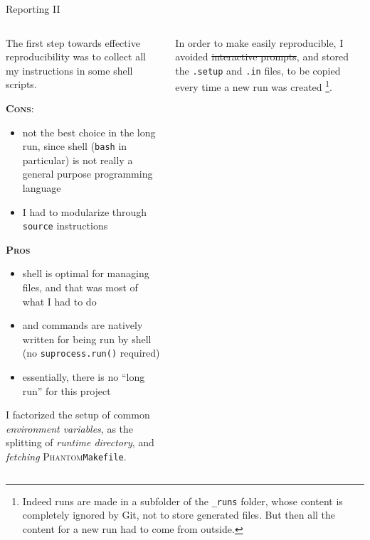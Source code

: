 \documentclass[9pt]{beamer}
\renewcommand{\phantom}{\textsc{Phantom}\xspace}
\begin{document}
\begin{frame}{Reporting II}
    \begin{columns}
        \begin{column}{0.5\textwidth}
            \vspace*{10pt}

            The first step towards effective reproducibility was to collect all
            my instructions in some shell scripts.
            \vspace*{10pt}

            \textsc{\color{BrickRed} \textbf{Cons}}:
            \begin{itemize}
                \item not the best choice in the long run, since shell
                    (\texttt{bash} in particular) is not really a general
                    purpose programming language
                \item I had to modularize through \texttt{source} instructions
            \end{itemize}
            
            \textsc{\color{mLightGreen} \textbf{Pros}}
            \begin{itemize}
                \item shell is optimal for managing files, and that was most of
                    what I had to do
                \item and commands are natively written for being run by shell
                    (no \texttt{suprocess.run()} required)
                \item essentially, there is no \enquote{long run} for this
                    project
            \end{itemize}
            \vspace*{10pt}
            
            I factorized the setup of common \textit{environment variables}, as
            the splitting of \textit{runtime directory}, and \textit{fetching}
            \phantom \texttt{Makefile}.
        \end{column}
        \begin{column}{0.5\textwidth}
            \vspace*{10pt}

            In order to make easily reproducible, I avoided \sout{interactive
            prompts}, and stored the \texttt{.setup} and \texttt{.in} files, to
            be copied every time a new run was created \footnote{
                Indeed runs are made in a subfolder of the \texttt{\_runs}
                folder, whose content is completely ignored by Git, not to
                store generated files.
                But then all the content for a new run had to come from
                outside.
            }.
            \vspace*{10pt}


\end{column}
\end{columns}
\end{frame}
\end{document}
